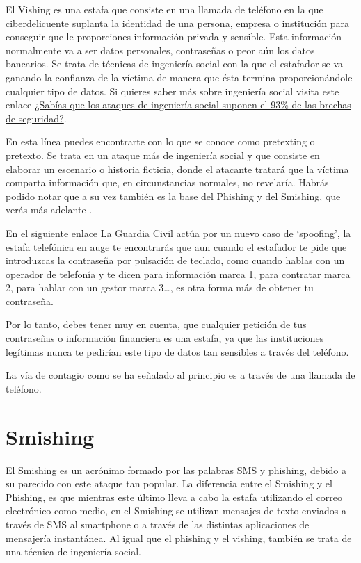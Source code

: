 \documentclass[
  a4paper,
  openany]{book}
\begin{document}
El Vishing es una estafa que consiste en una llamada de teléfono en la que ciberdelicuente suplanta la identidad de una persona, empresa o institución para conseguir que le proporciones información privada y sensible. Esta información normalmente va a ser datos personales, contraseñas o peor aún los datos bancarios. Se trata de técnicas de ingeniería social con la que el estafador se va ganando la confianza de la víctima de manera que ésta termina proporcionándole cualquier tipo de datos. Si quieres saber más sobre ingeniería social visita este enlace \href{https://www.osi.es/es/actualidad/blog/2019/12/04/sabias-que-los-ataques-de-ingenieria-social-suponen-el-93-de-las-brechas}{¿Sabías que los ataques de ingeniería social suponen el 93\% de las brechas de seguridad?}.

En esta línea puedes encontrarte con lo que se conoce como pretexting o pretexto. Se trata en un ataque más de ingeniería social y que consiste en elaborar un escenario o historia ficticia, donde el atacante tratará que la víctima comparta información que, en circunstancias normales, no revelaría. Habrás podido notar que a su vez también es la base del Phishing y del Smishing, que verás más adelante \citep{RZ-pretexting}.

En el siguiente enlace \href{https://www.genbeta.com/seguridad/guardia-civil-actua-nuevo-caso-spoofing-estafa-telefonica-auge}{La Guardia Civil actúa por un nuevo caso de `spoofing', la estafa telefónica en auge}
te encontrarás que aun cuando el estafador te pide que introduzcas la contraseña por pulsación de teclado, como cuando hablas con un operador de telefonía y te dicen para información marca 1, para contratar marca 2, para hablar con un gestor marca 3\ldots, es otra forma más de obtener tu contraseña.

Por lo tanto, debes tener muy en cuenta, que cualquier petición de tus contraseñas o información financiera es una estafa, ya que las instituciones legítimas nunca te pedirían este tipo de datos tan sensibles a través del teléfono.

La vía de contagio como se ha señalado al principio es a través de una llamada de teléfono.

\hypertarget{smishing}{%
\section{Smishing}\label{smishing}}

El Smishing es un acrónimo formado por las palabras SMS y phishing, debido a su parecido con este ataque tan popular. La diferencia entre el Smishing y el Phishing, es que mientras este último lleva a cabo la estafa utilizando el correo electrónico como medio, en el Smishing se utilizan mensajes de texto enviados a través de SMS al smartphone o a través de las distintas aplicaciones de mensajería instantánea. Al igual que el phishing y el vishing, también se trata de una técnica de ingeniería social.
\end{document}
